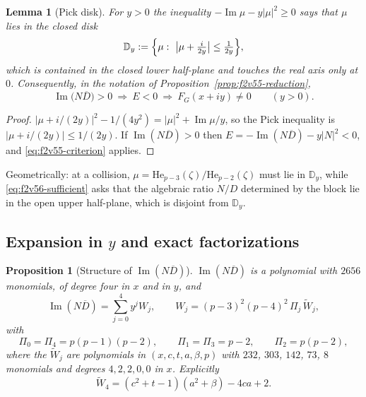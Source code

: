 \documentclass[11pt]{article}
\newtheorem{proposition}[theorem]{Proposition}
\newtheorem{lemma}[theorem]{Lemma}
\theoremstyle{definition}
\theoremstyle{remark}
\begin{document}
\begin{lemma}[Pick disk]
\label{lem:f2v56-disk}
For \(y>0\) the inequality \(-\operatorname{Im}\mu-y|\mu|^2\ge0\) says
that \(\mu\) lies in the closed disk
\begin{equation}
 \mathbb D_y:=\Bigl\{\mu:\ \bigl|\mu+\tfrac{i}{2y}\bigr|\le\tfrac1{2y}\Bigr\},
 \label{eq:f2v56-disk}
\end{equation}
which is contained in the closed lower half-plane and touches the real
axis only at \(0\).  Consequently, in the notation of
Proposition~\ref{prop:f2v55-reduction},
\begin{equation}
 \boxed{\;\operatorname{Im}\bigl(N\overline D\bigr)>0
 \ \Longrightarrow\ E<0\ \Longrightarrow\ F_G(x+iy)\ne0\qquad(y>0).\;}
 \label{eq:f2v56-sufficient}
\end{equation}
\end{lemma}

\begin{proof}
\(|\mu+i/(2y)|^2-1/(4y^2)=|\mu|^2+\operatorname{Im}\mu/y\), so the
Pick inequality is \(|\mu+i/(2y)|\le1/(2y)\).  If
\(\operatorname{Im}(N\overline D)>0\) then
\(E=-\operatorname{Im}(N\overline D)-y|N|^2<0\), and
\eqref{eq:f2v55-criterion} applies.
\end{proof}

Geometrically: at a collision, \(\mu=\mathrm{He}_{p-3}(\zeta)/\mathrm{He}_{p-2}(\zeta)\)
must lie in \(\mathbb D_y\), while \eqref{eq:f2v56-sufficient} asks that
the algebraic ratio \(N/D\) determined by the block lie in the open
upper half-plane, which is disjoint from \(\mathbb D_y\).

\subsection{Expansion in \texorpdfstring{\(y\)}{y} and exact factorizations}

\begin{proposition}[Structure of \(\operatorname{Im}(N\overline D)\)]
\label{prop:f2v56-structure}
\(\operatorname{Im}(N\overline D)\) is a polynomial with \(2656\)
monomials, of degree four in \(x\) and in \(y\), and
\begin{equation}
 \operatorname{Im}(N\overline D)=\sum_{j=0}^{4}y^jW_j,
 \qquad
 W_j=(p-3)^2(p-4)^2\,\Pi_j\,\widetilde W_j,
 \label{eq:f2v56-expansion}
\end{equation}
with
\begin{equation}
 \Pi_0=\Pi_4=p(p-1)(p-2),\qquad \Pi_1=\Pi_3=p-2,\qquad \Pi_2=p(p-2),
 \label{eq:f2v56-Pi}
\end{equation}
where the \(\widetilde W_j\) are polynomials in \((x,c,t,a,\beta,p)\)
with \(232\), \(303\), \(142\), \(73\), \(8\) monomials and degrees
\(4,2,2,0,0\) in \(x\).  Explicitly
\begin{equation}
 \widetilde W_4=(c^2+t-1)(a^2+\beta)-4ca+2 .
 \label{eq:f2v56-W4}
\end{equation}
\end{proposition}
\end{document}
